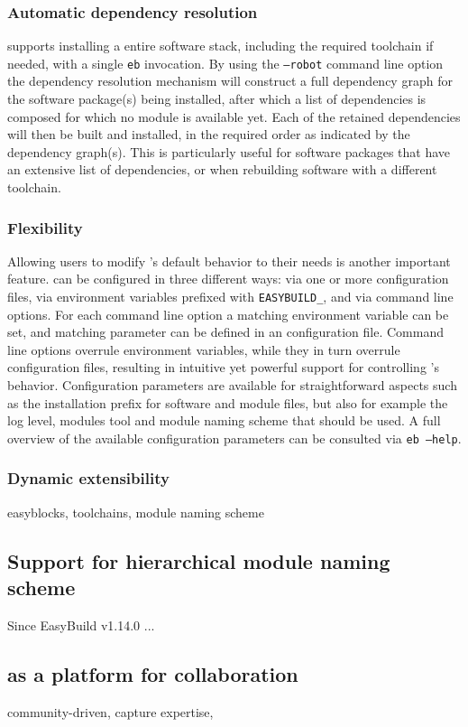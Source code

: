 \subsubsection{Automatic dependency resolution}
\label{sec:eb_dependency_resolution}

\easybuild{} supports installing a entire software stack, including the required
toolchain if needed, with a single \texttt{eb} invocation. By using the
\texttt{--robot} command line option the dependency resolution mechanism will
construct a full dependency graph for the software package(s) being installed, after
which a list of dependencies is composed for which no module is available yet. Each of
the retained dependencies will then be built and installed, in the required order as
indicated by the dependency graph(s). This is particularly useful for software
packages that have an extensive list of dependencies, or when rebuilding software
with a different toolchain.

\subsubsection{Flexibility}
\label{sec:eb_flexible}

Allowing users to modify \easybuild{}'s default behavior to their needs is another
important feature. \easybuild{} can be configured in three different ways: via one or
more configuration files, via environment variables prefixed with
\texttt{EASYBUILD\_}, and via command line options. For each command line option a
matching environment variable can be set, and matching parameter can be defined in an
configuration file. Command line options overrule environment variables, while they
in turn overrule configuration files, resulting in intuitive yet powerful support for
controlling \easybuild{}'s behavior. Configuration parameters are available for
straightforward aspects such as the installation prefix for software and module files,
but also for example the log level, modules tool and module naming scheme that should
be used. A full overview of the available configuration parameters can be consulted
via \texttt{eb --help}.

\subsubsection{Dynamic extensibility}
\label{sec:eb_extensible}

easyblocks, toolchains, module naming scheme


\subsection{Support for hierarchical module naming scheme}

Since EasyBuild v1.14.0 ...


\subsection{\easybuild{} as a platform for collaboration}

community-driven, capture expertise,
